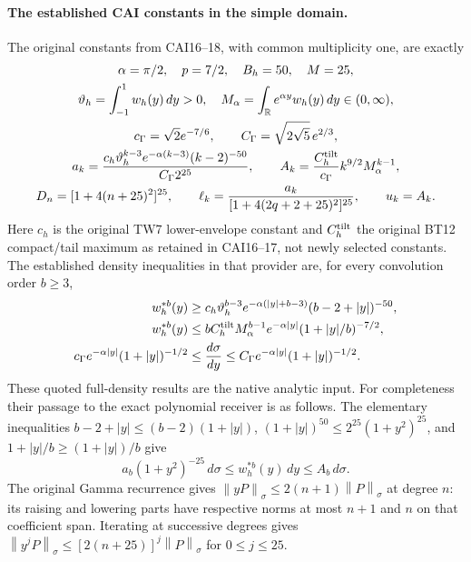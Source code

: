 \documentclass[11pt]{article}
\newcommand{\R}{\mathbb R}
\newcommand{\norm}[1]{\left\lVert#1\right\rVert}
\begin{document}
\paragraph{The established CAI constants in the simple domain.}
The original constants from CAI16--18, with common multiplicity one,
are exactly
\begin{equation}\label{eq:CAIconstants}
 \begin{gathered}
 \alpha=\pi/2,\quad p=7/2,\quad B_h=50,\quad M=25,\\
 \vartheta_h=\int_{-1}^1w_h(y)\,dy>0,\quad
 M_\alpha=\int_\R e^{\alpha y}w_h(y)\,dy\in(0,\infty),\\
 c_\Gamma=\sqrt2e^{-7/6},\qquad C_\Gamma=\sqrt{2\sqrt5}\,e^{2/3},\\
 a_k=\frac{c_h\vartheta_h^{k-3}e^{-\alpha(k-3)}(k-2)^{-50}}
              {C_\Gamma2^{25}},\qquad
 A_k=\frac{C_h^{\rm tilt}}{c_\Gamma}k^{9/2}M_\alpha^{k-1},\\
 D_n=[1+4(n+25)^2]^{25},\qquad
 \ell_k=\frac{a_k}{[1+4(2q+2+25)^2]^{25}},\qquad u_k=A_k.
 \end{gathered}
\end{equation}
Here $c_h$ is the original TW7 lower-envelope constant and
$C_h^{\rm tilt}$ the original BT12 compact/tail maximum as retained in
CAI16--17, not newly selected constants.  The established density
inequalities in that provider are, for every convolution order $b\ge3$,
\begin{align}
 w_h^{*b}(y)&\ge c_h\vartheta_h^{b-3}
 e^{-\alpha(|y|+b-3)}(b-2+|y|)^{-50},\label{eq:CAIlowdens}\\
 w_h^{*b}(y)&\le bC_h^{\rm tilt}M_\alpha^{b-1}
 e^{-\alpha|y|}(1+|y|/b)^{-7/2},\label{eq:CAIupdens}\\
 c_\Gamma e^{-\alpha|y|}(1+|y|)^{-1/2}
 &\le\frac{d\sigma}{dy}
 \le C_\Gamma e^{-\alpha|y|}(1+|y|)^{-1/2}.
 \label{eq:CAIgammadens}
\end{align}
These quoted full-density results are the native analytic input.  For
completeness their passage to the exact polynomial receiver is as follows.
The elementary inequalities
$b-2+|y|\le(b-2)(1+|y|)$,
$(1+|y|)^{50}\le2^{25}(1+y^2)^{25}$, and
$1+|y|/b\ge(1+|y|)/b$ give
\[
 a_b(1+y^2)^{-25}\,d\sigma\le w_h^{*b}(y)\,dy\le A_b\,d\sigma.
\]
The original Gamma recurrence gives
$\norm{yP}_\sigma\le2(n+1)\norm P_\sigma$ at degree $n$:
its raising and lowering parts have respective norms at most $n+1$
and $n$ on that coefficient span.  Iterating at successive degrees gives
$\norm{y^jP}_\sigma\le[2(n+25)]^j\norm P_\sigma$ for $0\le j\le25$.
\end{document}
